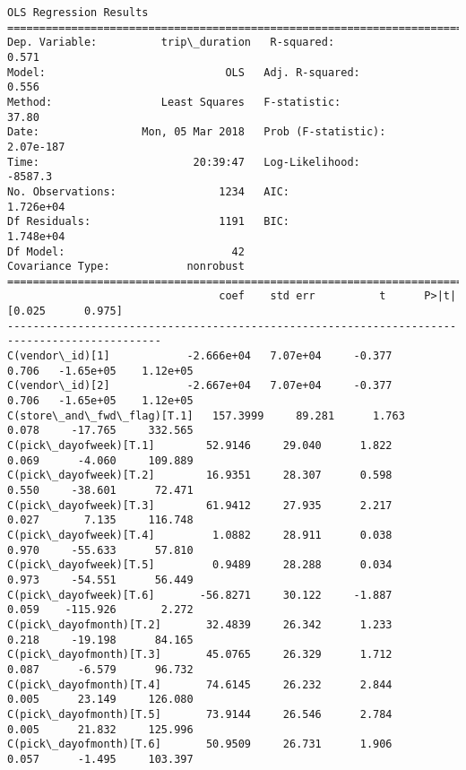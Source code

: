 \documentclass[11pt]{article}
\begin{document}
    \begin{Verbatim}[commandchars=\\\{\}]
                            OLS Regression Results                            
==============================================================================
Dep. Variable:          trip\_duration   R-squared:                       0.571
Model:                            OLS   Adj. R-squared:                  0.556
Method:                 Least Squares   F-statistic:                     37.80
Date:                Mon, 05 Mar 2018   Prob (F-statistic):          2.07e-187
Time:                        20:39:47   Log-Likelihood:                -8587.3
No. Observations:                1234   AIC:                         1.726e+04
Df Residuals:                    1191   BIC:                         1.748e+04
Df Model:                          42                                         
Covariance Type:            nonrobust                                         
==============================================================================================
                                 coef    std err          t      P>|t|      [0.025      0.975]
----------------------------------------------------------------------------------------------
C(vendor\_id)[1]            -2.666e+04   7.07e+04     -0.377      0.706   -1.65e+05    1.12e+05
C(vendor\_id)[2]            -2.667e+04   7.07e+04     -0.377      0.706   -1.65e+05    1.12e+05
C(store\_and\_fwd\_flag)[T.1]   157.3999     89.281      1.763      0.078     -17.765     332.565
C(pick\_dayofweek)[T.1]        52.9146     29.040      1.822      0.069      -4.060     109.889
C(pick\_dayofweek)[T.2]        16.9351     28.307      0.598      0.550     -38.601      72.471
C(pick\_dayofweek)[T.3]        61.9412     27.935      2.217      0.027       7.135     116.748
C(pick\_dayofweek)[T.4]         1.0882     28.911      0.038      0.970     -55.633      57.810
C(pick\_dayofweek)[T.5]         0.9489     28.288      0.034      0.973     -54.551      56.449
C(pick\_dayofweek)[T.6]       -56.8271     30.122     -1.887      0.059    -115.926       2.272
C(pick\_dayofmonth)[T.2]       32.4839     26.342      1.233      0.218     -19.198      84.165
C(pick\_dayofmonth)[T.3]       45.0765     26.329      1.712      0.087      -6.579      96.732
C(pick\_dayofmonth)[T.4]       74.6145     26.232      2.844      0.005      23.149     126.080
C(pick\_dayofmonth)[T.5]       73.9144     26.546      2.784      0.005      21.832     125.996
C(pick\_dayofmonth)[T.6]       50.9509     26.731      1.906      0.057      -1.495     103.397

\end{Verbatim}
\end{document}
